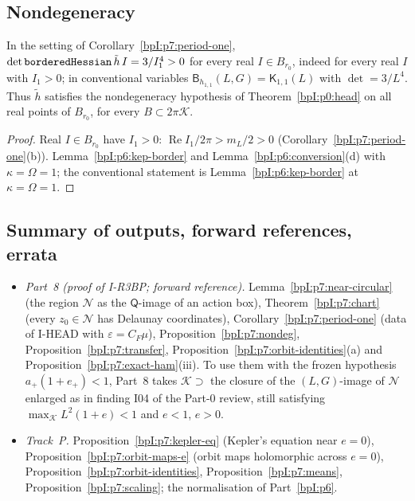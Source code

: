 \subsection{Nondegeneracy}\label{bpI:p7:sec-nondeg}

\begin{proposition}\label{bpI:p7:nondeg}
In the setting of Corollary~\ref{bpI:p7:period-one}, $\det\texttt{borderedHessian}\,\tilde h\,I=3/I_1^4>0$ for every real $I\in B_{r_0}$, indeed for every real $I$ with $I_1>0$; in conventional variables $\mathsf B_{h_{1,1}}(L,G)=\mathsf K_{1,1}(L)$ with $\det=3/L^4$.
Thus $\tilde h$ satisfies the nondegeneracy hypothesis of Theorem~\ref{bpI:p0:head} on all real points of $B_{r_0}$, for every $B\subset2\pi\mathcal K$.
\end{proposition}
\begin{proof}
\label{stepI:p7:nd-dom} Real $I\in B_{r_0}$ have $I_1>0$: $\operatorname{Re}I_1/2\pi>m_L/2>0$ (Corollary~\ref{bpI:p7:period-one}(b)).
\label{stepI:p7:nd-det} Lemma~\ref{bpI:p6:kep-border} and Lemma~\ref{bpI:p6:conversion}(d) with $\kappa=\Omega=1$; the conventional statement is Lemma~\ref{bpI:p6:kep-border} at $\kappa=\Omega=1$.
\end{proof}

\subsection{Summary of outputs, forward references, errata}\label{bpI:p7:sec-summary}

\begin{remark}\label{bpI:p7:outputs}
\begin{itemize}
\item \emph{Part~8 (proof of I-R3BP; forward reference).} Lemma~\ref{bpI:p7:near-circular} (the region $\mathcal N$ as the $\mathsf Q$-image of an action box), Theorem~\ref{bpI:p7:chart} (every $z_0\in\mathcal N$ has Delaunay coordinates), Corollary~\ref{bpI:p7:period-one} (data of I-HEAD with $\varepsilon=C_F\mu$), Proposition~\ref{bpI:p7:nondeg}, Proposition~\ref{bpI:p7:transfer}, Proposition~\ref{bpI:p7:orbit-identities}(a) and Proposition~\ref{bpI:p7:exact-ham}(iii). To use them with the frozen hypothesis $a_+(1+e_+)<1$, Part~8 takes $\mathcal K\supset$ the closure of the $(L,G)$-image of $\mathcal N$ enlarged as in finding I04 of the Part-0 review, still satisfying $\max_{\mathcal K}L^2(1+e)<1$ and $e<1$, $e>0$.
\item \emph{Track~P.} Proposition~\ref{bpI:p7:kepler-eq} (Kepler's equation near $e=0$), Proposition~\ref{bpI:p7:orbit-maps-e} (orbit maps holomorphic across $e=0$), Proposition~\ref{bpI:p7:orbit-identities}, Proposition~\ref{bpI:p7:means}, Proposition~\ref{bpI:p7:scaling}; the normalisation of Part~\ref{bpI:p6}.
\end{itemize}
\end{remark}

